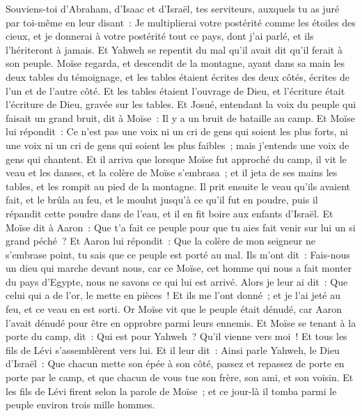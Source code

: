 \begin{multicols}{2}
Souviens-toi d'Abraham, d'Isaac et d'Israël, tes serviteurs, auxquels tu as juré par toi-même en leur disant~: Je multiplierai votre postérité comme les étoiles des cieux, et je donnerai à votre postérité tout ce pays, dont j'ai parlé, et ils l'hériteront à jamais.
Et Yahweh se repentit du mal qu'il avait dit qu'il ferait à son peuple.
Moïse regarda, et descendit de la montagne, ayant dans sa main les deux tables du témoignage, et les tables étaient écrites des deux côtés, écrites de l'un et de l'autre côté.
Et les tables étaient l'ouvrage de Dieu, et l'écriture était l'écriture de Dieu, gravée sur les tables.
Et Josué, entendant la voix du peuple qui faisait un grand bruit, dit à Moïse~: Il y a un bruit de bataille au camp.
Et Moïse lui répondit~: Ce n'est pas une voix ni un cri de gens qui soient les plus forts, ni une voix ni un cri de gens qui soient les plus faibles~; mais j'entends une voix de gens qui chantent.
Et il arriva que lorsque Moïse fut approché du camp, il vit le veau et les danses, et la colère de Moïse s'embrasa~; et il jeta de ses mains les tables, et les rompit au pied de la montagne.
Il prit ensuite le veau qu'ils avaient fait, et le brûla au feu, et le moulut jusqu'à ce qu'il fut en poudre, puis il répandit cette poudre dans de l'eau, et il en fit boire aux enfants d'Israël.
Et Moïse dit à Aaron~: Que t'a fait ce peuple pour que tu aies fait venir sur lui un si grand péché~?
Et Aaron lui répondit~: Que la colère de mon seigneur ne s'embrase point, tu sais que ce peuple est porté au mal.
Ils m'ont dit~: Fais-nous un dieu qui marche devant nous, car ce Moïse, cet homme qui nous a fait monter du pays d'Egypte, nous ne savons ce qui lui est arrivé.
Alors je leur ai dit~: Que celui qui a de l'or, le mette en pièces~! Et ils me l'ont donné~; et je l'ai jeté au feu, et ce veau en est sorti.
Or Moïse vit que le peuple était dénudé, car Aaron l'avait dénudé pour être en opprobre parmi leurs ennemis.
Et Moïse se tenant à la porte du camp, dit~: Qui est pour Yahweh~? Qu'il vienne vers moi~! Et tous les fils de Lévi s'assemblèrent vers lui.
Et il leur dit~: Ainsi parle Yahweh, le Dieu d'Israël~: Que chacun mette son épée à son côté, passez et repassez de porte en porte par le camp, et que chacun de vous tue son frère, son ami, et son voisin.
Et les fils de Lévi firent selon la parole de Moïse~; et ce jour-là il tomba parmi le peuple environ trois mille hommes.

\end{multicols}
